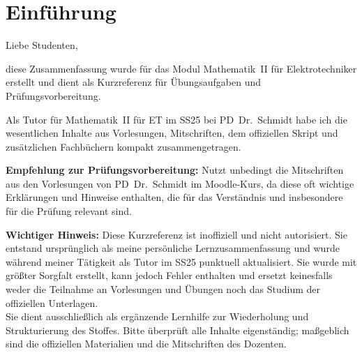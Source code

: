 \documentclass[a4paper,11pt,oneside,open=any,parskip=half, DIV=15]{scrreprt}
\newcommand{\TitleBlockWidth}{0.60\paperwidth}
\newcommand{\TitleLineGap}{1.0em}
\newcommand{\TitleText}[1]{\textcolor{titlefg}{#1}}
\newcommand{\SubtitleText}[1]{\textcolor{subtitlefg}{#1}}
\begin{document}

\begin{titlepage}


\end{titlepage}

\pagecolor{white}
\cleardoublepage{}


\section*{Einführung}
   Liebe Studenten,

   diese Zusammenfassung wurde für das Modul Mathematik~II für Elektrotechniker erstellt und dient als Kurzreferenz für Übungsaufgaben und Prüfungsvorbereitung.

   Als Tutor für Mathematik~II für ET im SS25 bei PD~Dr.\ Schmidt habe ich die wesentlichen Inhalte aus Vorlesungen, Mitschriften, dem offiziellen Skript und zusätzlichen Fachbüchern kompakt zusammengetragen. 

   \textbf{Empfehlung zur Prüfungsvorbereitung:} Nutzt unbedingt die Mitschriften aus den Vorlesungen von PD~Dr.\ Schmidt im Moodle-Kurs, da diese oft wichtige Erklärungen und Hinweise enthalten, die für das Verständnis und insbesondere für die Prüfung relevant sind.

   \vspace{0.5em}
   \textbf{Wichtiger Hinweis:}
   Diese Kurzreferenz ist inoffiziell und nicht autorisiert. Sie entstand ursprünglich als meine persönliche Lernzusammenfassung und wurde während meiner Tätigkeit als Tutor im SS25 punktuell aktualisiert. Sie wurde mit größter Sorgfalt erstellt, kann jedoch Fehler enthalten und ersetzt keinesfalls weder die Teilnahme an Vorlesungen und Übungen noch das Studium der offiziellen Unterlagen.\\
   Sie dient ausschließlich als ergänzende Lernhilfe zur Wiederholung und Strukturierung des Stoffes. Bitte überprüft alle Inhalte eigenständig; maßgeblich sind die offiziellen Materialien und die Mitschriften des Dozenten.
\end{document}

